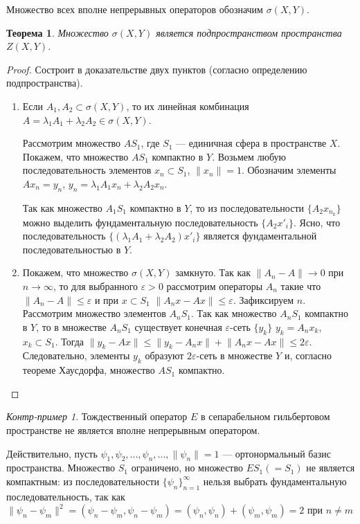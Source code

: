 \documentclass[12pt,a4paper,titlepage,oneside]{book}
\theoremstyle{definition}
\theoremstyle{plain}
\newtheorem*{theorem}{Теорема}
\theoremstyle{remark}
\theoremstyle{remark}
\theoremstyle{remark}
\theoremstyle{remark}
\newtheorem*{cexample}{Контр-пример}
\theoremstyle{plain}
\theoremstyle{plain}
\begin{document}
Множество всех вполне непрерывных операторов обозначим $\sigma(X,Y)$.
\begin{theorem}Множество $\sigma(X,Y)$ является подпространством пространства $Z(X, Y)$.
\end{theorem}
\begin{proof}Состроит в доказательстве двух пунктов (согласно определению подпространства).

\begin{enumerate}

	\item Если $A_1, A_2 \subset \sigma(X,Y)$, то их линейная комбинация $A=\lambda_1 A_1+\lambda_2 A_2\in \sigma(X,Y)$.

Рассмотрим множество $AS_1$, где $S_1$ --- единичная сфера в пространстве $X$. Покажем, что множество $AS_1$ компактно в $Y$. Возьмем любую последовательность элементов $x_n \subset S_1$, $\lVert x_n \rVert=1$. Обозначим элементы $Ax_n=y_n$, $y_n=\lambda_1 A_1 x_n+\lambda_2 A_2 x_n$.

Так как множество $A_1S_1$ компактно в $Y$, то из последовательности $\lbrace A_2x_{n_k} \rbrace$ можно выделить фундаментальную последовательность $\lbrace A_2x'_i \rbrace$. Ясно, что последовательность $\lbrace (\lambda_1 A_1+\lambda_2 A_2)x'_i \rbrace$ является фундаментальной последовательностью в $Y$.

	\item Покажем, что множество $\sigma(X,Y)$ замкнуто. Так как $\lVert A_n-A \rVert \to 0$ при $n\to \infty$, то для выбранного $\varepsilon > 0$ рассмотрим операторы $A_n$ такие что $\lVert A_n-A \rVert \leq  \varepsilon$ и при $x \subset S_1$ $\lVert A_n x-Ax\rVert \leq  \varepsilon$. Зафиксируем $n$. Рассмотрим множество элементов $A_n S_1$. Так как множество $A_n S_1$ компактно в $Y$, то в множестве $A_n S_1$ существует конечная $\varepsilon$-сеть $\lbrace y_k \rbrace$ $y_k=A_n x_k$, $x_k \subset S_1$. Тогда $\lVert y_k - Ax\rVert \leq \lVert y_k - A_n x\rVert + \lVert A_n x - Ax\rVert \leq 2\varepsilon$. Следовательно, элементы $y_k$ образуют $2\varepsilon$-сеть в множестве $Y$ и, согласно теореме Хаусдорфа, множество $AS_1$ компактно.

\end{enumerate}
\end{proof}

\begin{cexample}Тождественный оператор $E$ в сепарабельном гильбертовом пространстве не является вполне непрерывным оператором.

Действительно, пусть $\psi_1,\psi_2,...,\psi_n,..., \lVert\psi_n\rVert =1$ --- ортонормальный базис пространства. Множество $S_1$ ограничено, но множество $ES_1 (=S_1)$ не является компактным: из последовательности $\lbrace \psi_n \rbrace_{n=1}^{\infty}$ нельзя выбрать фундаментальную последовательность, так как $\lVert\psi_n - \psi_m \rVert ^2=(\psi_n - \psi_m, \psi_n - \psi_m)= (\psi_n,\psi_n)+ (\psi_m,\psi_m)=2$ при $n \neq m$
\end{cexample}
\end{document}
